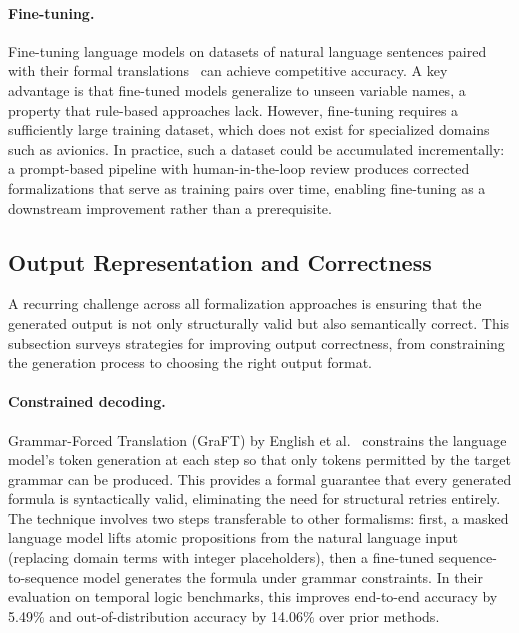 \paragraph{Fine-tuning.}
Fine-tuning language models on datasets of natural language sentences
paired with their formal translations~\cite{hahn2022formal} can achieve
competitive accuracy. A key advantage is that fine-tuned models
generalize to unseen variable names, a property that rule-based
approaches lack. However, fine-tuning requires a sufficiently large
training dataset, which does not exist for specialized domains such as
avionics. In practice, such a dataset could be accumulated incrementally:
a prompt-based pipeline with human-in-the-loop review produces corrected
formalizations that serve as training pairs over time, enabling
fine-tuning as a downstream improvement rather than a prerequisite.

\subsection{Output Representation and Correctness}
\label{sec:sota-output}

A recurring challenge across all formalization approaches is ensuring
that the generated output is not only structurally valid but also
semantically correct. This subsection surveys strategies for improving
output correctness, from constraining the generation process to choosing
the right output format.

\paragraph{Constrained decoding.}
Grammar-Forced Translation (GraFT) by English
et al.~\cite{english2025graft} constrains the language model's token
generation at each step so that only tokens permitted by the target
grammar can be produced. This provides a formal guarantee that every
generated formula is syntactically valid, eliminating the need for
structural retries entirely. The technique involves two steps
transferable to other formalisms: first, a masked language model lifts
atomic propositions from the natural language input (replacing domain
terms with integer placeholders), then a fine-tuned sequence-to-sequence
model generates the formula under grammar constraints. In their
evaluation on temporal logic benchmarks, this improves end-to-end
accuracy by 5.49\% and out-of-distribution accuracy by 14.06\% over
prior methods.

